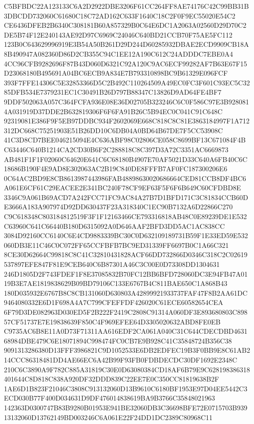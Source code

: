 \documentclass[UTF8,fontset=fandol,zihao=-4,a4paper]{ctexart}
\begin{document}
{{C5BFBDC22A123133C6A2D2922DBE3206F61CC264FF8AE74176C42C99BB31B3DBCDD732060C61680C18C72AD162C633F1640C18C2F0F9EC55020E54C2
CE6436DFEB2B6340C308181B60A857329B0C64E6DC1A2063A02560D29D70C2DE5B74F12E240143AE92D97C6969C24046C640BD21CCB70F75AE5FC112
123B0C643629996919E3B54A50B261D29D244D60285932DBAE2ECD9909CB18A8B490947A082360D86D2CB355C94C1EE12A190C612C24ADDDC7EBE0A4
4CC96CFB9282696F87B43D060D6321C92A120C9AC6ECF99282AF7B63E67F15D23068180B495691A04BC6ECB9A834E7B793310898BC9B61329E096FCF
393F7FFE14306C5E32853366D5C2B492C110264509A49EC0FC3F601C93EC5C3285DFB534E7379231EC1C30491B26D797B88347C13826D9AD64FE4BF7
9DDF502063A057C364FCFA936E08E36D02705B323246C6C0F586C97E3B9280814A031919D37DDE2B632819306F6F6FA91B26C5B94EC0C041C91C648C
92319081E386F9F5EB97DDBC934F2602069E668C818C8C81E3863184997F1A712312DC668C75251903E51B26DD10C6DB04A0BD64B67DE7F5CC53908C
41C3D8CD7BEE046215094E4C636ABF98C02806CE058C8699BF13C671084F4BC63446C640B1214CA2CD30B6F2C288818C8C397D3A72C3351AC6669873
AB481F1F1F02060C64620E641C6C68180B4907E70AF5021D33C640A6FB40C6C18686B190F4E9AD8E302063AC2B19C840DE8FFFB7AF0FC187300206E6
0C64AC2BD9E8CB8613987443986FAB48898630020686664CED81CCB8DF4BC6A061E6CF61C29EACEE2E341BC240F78CF9EF63F5F6F6B649C60CFDBD8E
3346C9A061B69ACD7A242FCC71FC9AC84A27B7D1BFD171C3C81834CCB60DE3666A183A907974D92DD630437F23A318340C1EC90B7132A6D22866C270
C9C618348C803184812519F3F1F12163466CE793316818AB48C0E89239DE1E532C63960C641C66440B180D6315092A0D646AAF2BFD3DD5AC1AC838CC
3084D92160CC6140C6E4CD9883339BC30C0D632109189731B59F1E33ED59E532060DB3E11C46C0C072FF65CCFBFB7BC9ED31339FF6697B0C1A66C321
8CE30D62664C99818C8C41C32810431828ACF66DD732866D0346C318C2C02619537897EFE847F81E9CEB640C6B87301A46C3C00E0D73308DD1304631
246D1805D2F743FDEF1F8E37085832B70FC12BB6BFD728060DC3E94FB47A0119B3E7AE1819838629B09BD79106C133E6767B4C811BAE650C1A868B43
180D035932E6767B8C8CB131060D630803A42899921933737FAF47F8B2AA61DC9464080332E6D1F698A4A7C799CFEFFDF426020C61ECE60582654CEA
6F79D3DE082963D030ED5F2B222F2419C2808C91314A060DF3E893680803C89857CF51737E7E19838639F850C4F969EFEE64D3305020632ABD8FE0EB
C9735AC6B8E11A0D73F71311AA616EDF2CA061A040C31C644CDECDBD463168984DBE479C6E18071894C998474FC0CB7E9B928C41C35848724B356C38
9091313286380D13FFF3986821C9D1052533E6DB2EDFEC19B3F0BB9E8C61AB214CCC86318481DD4AE66EC6A42B99F93FB0FDBDECDC30DF1692E2348C
210C6C3890A9F782C885A31819C30E0D63080384CD18AF6B79E9C628198386318401644C8D818C838A920DF32DDD839C22EE7E0C350CC81819638B2F
1AE6D1B823F21046C3808C913132060D13B9610C6180BF1953E97D04EE5442C3ECD030B77F400D034631D9DF476014838619BA9B3766C35848021963
142363D0300747B83B9280B01953E941BE32060DB3C36698BFE72E0715703B93913132060D13762149BD003246C6A061E22F24DD1DC2389C80968C11
}}
\end{document}
